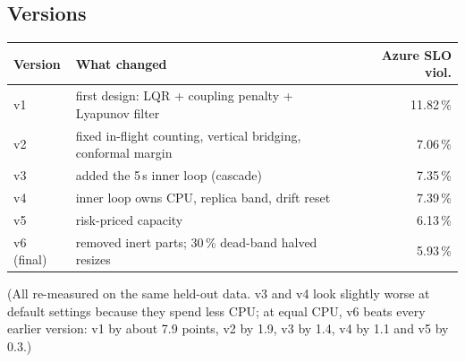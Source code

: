 \documentclass[11pt,a4paper]{article}
\begin{document}
\subsection{Versions}
\begin{center}
\begin{tabular}{@{}lp{9.6cm}r@{}}
\toprule
Version & What changed & Azure SLO viol. \\
\midrule
v1 & first design: LQR + coupling penalty + Lyapunov filter & 11.82\,\% \\
v2 & fixed in-flight counting, vertical bridging, conformal margin & 7.06\,\% \\
v3 & added the 5\,s inner loop (cascade) & 7.35\,\% \\
v4 & inner loop owns CPU, replica band, drift reset & 7.39\,\% \\
v5 & risk-priced capacity & 6.13\,\% \\
v6 (final) & removed inert parts; 30\,\% dead-band halved resizes & 5.93\,\% \\
\bottomrule
\end{tabular}
\end{center}
(All re-measured on the same held-out data. v3 and v4 look slightly worse at default
settings because they spend less CPU; at equal CPU, v6 beats every earlier version: v1 by
about 7.9 points, v2 by 1.9, v3 by 1.4, v4 by 1.1 and v5 by 0.3.)
\end{document}
